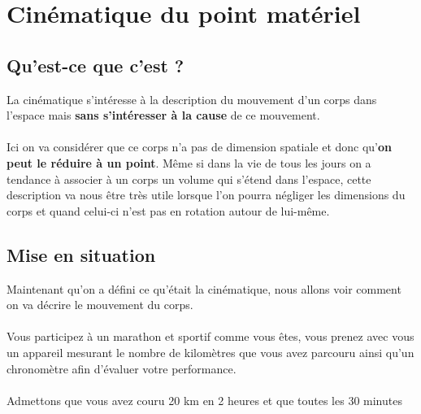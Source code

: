 \documentclass[a4paper,11pt]{article}
\begin{document}
\section{Cinématique du point matériel}
    \subsection{Qu'est-ce que c'est ?}
    La cinématique s'intéresse à la description du mouvement d'un corps dans l'espace mais \textbf{sans s'intéresser à la cause} de ce mouvement.
    \\
    \\
    Ici on va considérer que ce corps n'a pas de dimension spatiale et donc qu'\textbf{on peut le réduire à un point}.
    Même si dans la vie de tous les jours on a tendance à associer à un corps un volume qui s'étend dans l'espace,
    cette description va nous être très utile lorsque l'on pourra négliger les dimensions du corps et quand celui-ci n'est pas en rotation autour de lui-même.
    

    \subsection{Mise en situation}
    Maintenant qu'on a défini ce qu'était la cinématique, nous allons voir comment on va décrire le mouvement du corps.
    \\
    \\
    Vous participez à un marathon et sportif comme vous êtes, vous prenez avec vous un appareil mesurant le nombre de kilomètres que vous avez parcouru ainsi qu'un chronomètre afin d'évaluer votre performance.
    \\
    \\
    Admettons que vous avez couru 20 km en 2 heures et que toutes les 30 minutes  
\end{document}
